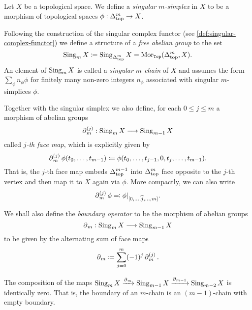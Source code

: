 \begin{definition}
\label{def:singular-simplex}
Let \(X\) be a topological space. We define a \emph{singular \(m\)-simplex} in
\(X\) to be a morphism of topological spaces \(\phi: \Delta_{\text{top}}^m \to X\).

Following the construction of the singular complex functor (see
\cref{def:singular-complex-functor}) we define a structure of a \emph{free
  abelian group} to the set
\[
\operatorname{Sing}_m X \coloneq \operatorname{Sing}_{\Delta_{\text{top}}^m} X = \operatorname{Mor}_{{\texttt{Top}}}(\Delta_{\text{top}}^m, X).
\]
An element of \(\operatorname{Sing}_m X\) is called a \emph{singular \(m\)-chain} of \(X\) and
assumes the form \(\sum_{\phi} n_{\phi} \phi\) for finitely many non-zero
integers \(n_{\phi}\) associated with singular \(m\)-simplices \(\phi\).

Together with the singular simplex we also define, for each \(0 \leq j \leq m\)
a morphism of abelian groups
\[
\operatorname{\partial}_m^{(j)}: \operatorname{Sing}_m X \longrightarrow \operatorname{Sing}_{m-1} X
\]
called \emph{\(j\)-th face map}, which is explicitly given by
\[
\operatorname{\partial}_m^{(j)} \phi(t_0, \dots, t_{m-1})
\coloneq \phi(t_0, \dots, t_{j-1}, 0, t_j, \dots, t_{m-1}).
\]
That is, the \(j\)-th face map embeds \(\Delta_{\text{top}}^{m-1}\) into \(\Delta_{\text{top}}^m\)
face opposite to the \(j\)-th vertex and then map it to \(X\) again via
\(\phi\). More compactly, we can also write
\[
\operatorname{\partial}_m^{(j)} \phi \eqqcolon \phi|_{[0, \dots, \widehat j, \dots, m]}.
\]

We shall also define the \emph{boundary operator} to be the morphism
of abelian groups
\[
\operatorname{\partial}_m: \operatorname{Sing}_m X \longrightarrow \operatorname{Sing}_{m-1} X
\]
to be given by the alternating sum of face maps
\[
\operatorname{\partial}_m \coloneq \sum_{j=0}^m (-1)^j \operatorname{\partial}_m^{(j)}.
\]
\end{definition}

\begin{proposition}
\label{prop:boundary-squared-is-zero}
The composition of the maps
\(\operatorname{Sing}_m X \xrightarrow{\operatorname{\partial}_m} \operatorname{Sing}_{m-1} X \xrightarrow{\operatorname{\partial}_{m-1}}
\operatorname{Sing}_{m-2} X\) is identically zero. That is, the boundary of an \(m\)-chain is
an \((m-1)\)-chain with empty boundary.
\end{proposition}

